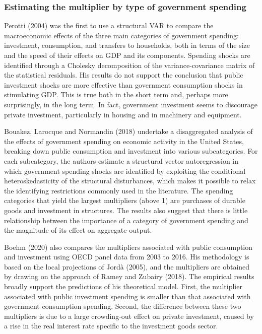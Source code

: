 \documentclass[12pt,letterpaper]{article}
\begin{document}
\subsubsection{Estimating the multiplier by type of government spending}

Perotti (2004) was the first to use a structural VAR to compare the macroeconomic effects of the three main categories of government spending: investment, consumption, and transfers to households, both in terms of the size and the speed of their effects on GDP and its components. Spending shocks are identified through a Cholesky decomposition of the variance-covariance matrix of the statistical residuals. His results do not support the conclusion that public investment shocks are more effective than government consumption shocks in stimulating GDP. This is true both in the short term and, perhaps more surprisingly, in the long term. In fact, government investment seems to discourage private investment, particularly in housing and in machinery and equipment.

Bouakez, Larocque and Normandin (2018) undertake a disaggregated analysis of the effects of government spending on economic activity in the United States, breaking down public consumption and investment into various subcategories. For each subcategory, the authors estimate a structural vector autoregression in which government spending shocks are identified by exploiting the conditional heteroskedasticity of the structural disturbances, which makes it possible to relax the identifying restrictions commonly used in the literature. The spending categories that yield the largest multipliers (above 1) are purchases of durable goods and investment in structures. The results also suggest that there is little relationship between the importance of a category of government spending and the magnitude of its effect on aggregate output.

Boehm (2020) also compares the multipliers associated with public consumption and investment using OECD panel data from 2003 to 2016. His methodology is based on the local projections of Jord\`a (2005), and the multipliers are obtained by drawing on the approach of Ramey and Zubairy (2018). The empirical results broadly support the predictions of his theoretical model. First, the multiplier associated with public investment spending is smaller than that associated with government consumption spending. Second, the difference between these two multipliers is due to a large crowding-out effect on private investment, caused by a rise in the real interest rate specific to the investment goods sector.
\end{document}
